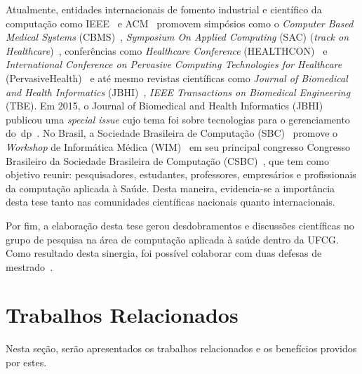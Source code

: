 


Atualmente, entidades internacionais de fomento industrial e científico da computação como IEEE~\cite{ieee2016} e ACM~\cite{acm2016} promovem simpósios como o \textit{Computer Based Medical Systems} (CBMS)~\cite{cbms2016}, \textit{Symposium On Applied Computing} (SAC) (\textit{track on Healthcare})~\cite{sachealth2016}, conferências como \textit{Healthcare Conference} (HEALTHCON)~\cite{healthcon2016} e \textit{International Conference on Pervasive Computing Technologies for Healthcare} (PervasiveHealth)~\cite{pervasivehealth2016} e até mesmo revistas científicas como \textit{Journal of Biomedical and Health Informatics} (JBHI)~\cite{jbhi2016}, \textit{IEEE Transactions on Biomedical Engineering}~\cite{tbe2016} (TBE). Em 2015, o Journal of Biomedical and Health Informatics (JBHI) publicou uma \textit{special issue} cujo tema foi sobre tecnologias para o gerenciamento do~\ac{dp}~\cite{specjbhi2015}. No Brasil, a Sociedade Brasileira de Computação (SBC)~\cite{sbc2016} promove o \textit{Workshop} de Informática Médica (WIM)~\cite{wim2016} em seu principal congresso Congresso Brasileiro da Sociedade Brasileira de Computação (CSBC)~\cite{csbc2016}, que tem como objetivo reunir: pesquisadores, estudantes, professores, empresários e profissionais da computação aplicada à Saúde. Desta maneira, evidencia-se a importância desta tese tanto nas comunidades científicas nacionais quanto internacionais.


Por fim, a elaboração desta tese gerou desdobramentos e discussões científicas no grupo de pesquisa na área de computação aplicada à saúde dentro da UFCG. Como resultado desta sinergia, foi possível colaborar com duas defesas de mestrado~\cite{antonio2013,gustavo2014}. 


\section{Trabalhos Relacionados}\label{section:trabalhos_relacionados}
Nesta seção, serão apresentados os trabalhos relacionados e os benefícios providos por estes.

